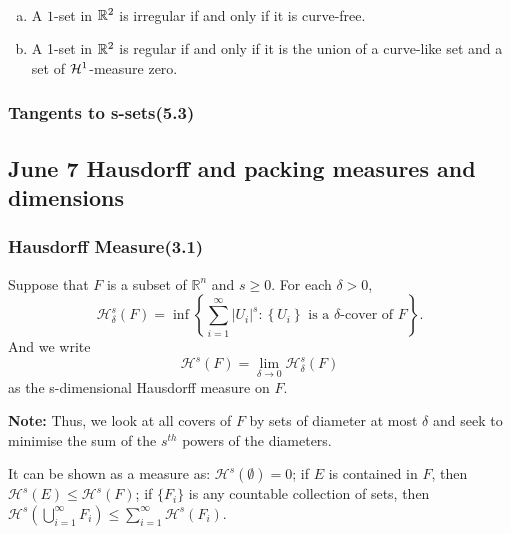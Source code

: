 \begin{theorem}\label{thm5.9} $ $
    \begin{enumerate}[a.]
        \item A $1$-set in $\mathbb{R}^2$ is irregular if and only if it is curve-free.
        \item A 1-set in $\mathbb{R}^2$ is regular if and only if it is the union of a curve-like set and a set of $\mathcal{H}^1$-measure zero. 
    \end{enumerate}
\end{theorem}



\newpage
\subsubsection{Tangents to s-sets(5.3)}









\newpage

\subsection{June 7 Hausdorff and packing measures and dimensions}
\subsubsection{Hausdorff Measure(3.1)}
\begin{definition}
    Suppose that $F$ is a subset of $\mathbb{R}^n$ and $s\geq 0$. For each $\delta >0$,
    $$
    \mathcal{H}_{\delta}^{s}(F)=\inf \left\{\sum_{i=1}^{\infty}\left|U_{i}\right|^{s}:\left\{U_{i}\right\} \text { is a } \delta \text {-cover of } F\right\} .
    $$
    And we write
    $$
    \mathcal{H}^s (F) = \lim_{\delta\rightarrow 0} \mathcal{H}^s_\delta(F)
    $$
    as the s-dimensional Hausdorff measure on $F$.
\end{definition}

\textbf{Note:}
Thus, we look at all covers of $F$ by sets of diameter at most $\delta$ and seek to minimise the sum of the  $s^{th}$ powers of the diameters.

It can be shown as a measure as: $\mathcal{H}^s(\emptyset) = 0$; if $E$ is contained in $F$, then $\mathcal{H}^s(E)\leq \mathcal{H}^s(F)$; if $\{F_i\}$ is any countable collection of sets, then $\displaystyle \mathcal{H}^{s}\left(\bigcup_{i=1}^{\infty} F_{i}\right) \leq \sum_{i=1}^{\infty} \mathcal{H}^{s}\left(F_{i}\right)$.

